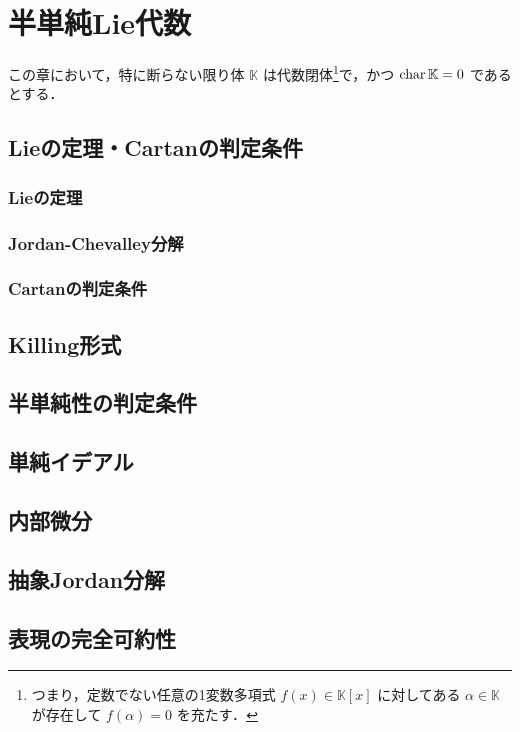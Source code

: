 \documentclass[rep_main]{subfiles}
\begin{document}
\setcounter{chapter}{1}

\chapter{半単純Lie代数}

この章において，特に断らない限り体 $\mathbb{K}$ は代数閉体\footnote{つまり，定数でない任意の1変数多項式 $f(x) \in \mathbb{K}[x]$ に対してある $\alpha \in \mathbb{K}$ が存在して $f(\alpha) = 0$ を充たす．}で，かつ $\operatorname{char} \mathbb{K} = 0$ であるとする．

\section{Lieの定理・Cartanの判定条件}

\subsection{Lieの定理}

\subsection{Jordan-Chevalley分解}
\subsection{Cartanの判定条件}

\section{Killing形式}

\section{半単純性の判定条件}
\section{単純イデアル}
\section{内部微分}
\section{抽象Jordan分解}

\section{表現の完全可約性}
\end{document}
